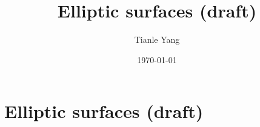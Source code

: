 \documentclass{noteformyself}
\title{Elliptic surfaces (draft)}
\author{Tianle Yang}
\date{\today}
\begin{document}
    \maketitle

    \section{Elliptic surfaces (draft)}


\end{document}
